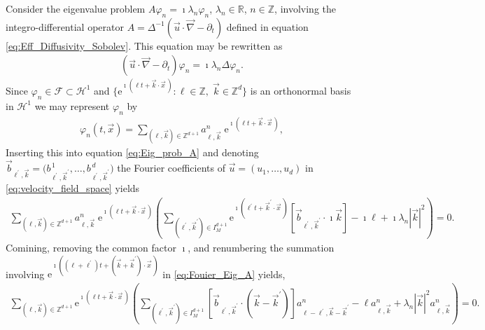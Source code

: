 \documentclass[11pt]{amsart}
\newcommand{\e}{\mathrm{e}}
\newcommand{\Hc}{\mathcal{H}}
\newcommand{\Fc}{\mathcal{F}}
\begin{document}
Consider the eigenvalue problem $A\varphi_n=\imath\lambda_n\varphi_n$, $\lambda_n\in\mathbb{R}$,
$n\in\mathbb{Z}$, involving the integro-differential operator 
$A=\Delta^{-1}(\vec{u}\cdot\vec{\nabla}-\partial_t)$ defined in equation
\eqref{eq:Eff_Diffusivity_Sobolev}. This equation may be rewritten as      
%
\begin{align}\label{eq:Eig_prob_A}
  (\vec{u}\cdot\vec{\nabla}-\partial_t)\varphi_n=\imath\lambda_n\Delta\varphi_n.
\end{align}
%
Since $\varphi_n\in\Fc\subset\Hc^1$ and
$\{\e^{\imath(\ell t+\vec{k}\cdot\vec{x}\,)}:\ell\in\mathbb{Z},\;\vec{k}\in\mathbb{Z}^d\}$ 
is an orthonormal basis in $\Hc^1$ \cite{Folland:99} we may represent
$\varphi_n$ by
% 
\begin{align}\label{eq:Fourier_Eig_fun}
  \varphi_n(t,\vec{x})=\sum_{(\ell,\vec{k})\in\mathbb{Z}^{d+1}}a^n_{\ell,\vec{k}}\;\e^{\imath(\ell t+\vec{k}\cdot\vec{x}\,)},
\end{align}
%
Inserting this into equation \eqref{eq:Eig_prob_A} and denoting 
$\vec{b}_{\ell^\prime,\vec{k}}=\big(b^{\,1}_{\ell^\prime,\vec{k}^\prime},\ldots,b^{\,d}_{\ell^\prime,\vec{k}^\prime}\big)$
the Fourier coefficients of $\vec{u}=(u_1,\ldots,u_d)$ in
\eqref{eq:velocity_field_space} yields   
%
\begin{align}\label{eq:Fouier_Eig_A}
  \sum_{(\ell,\vec{k})\in\mathbb{Z}^{d+1}
  }a^n_{\ell,\vec{k}}\;\e^{\imath(\ell t+\vec{k}\cdot\vec{x}\,)}
  \left(
    \sum_{(\ell^\prime,\vec{k}^\prime)\in I_M^{d+1}}\e^{\imath(\ell^\prime t+\vec{k}^\prime\cdot\vec{x}\,)}
  \left[\vec{b}_{\ell^\prime,\vec{k}^\prime}\cdot\imath\vec{k}
       \right]
  -\imath\ell
  +\imath\lambda_n|\vec{k}|^2\right)=0.
\end{align}
%
Comining, removing the common factor $\imath$, and renumbering the summation
involving $\e^{\imath((\ell+\ell^\prime)t+(\vec{k}+\vec{k}^\prime)\cdot\vec{x}\,)}$ in
\eqref{eq:Fouier_Eig_A} yields,
%
\begin{align}\label{eq:Fouier_Eig_A_resum}
  \sum_{(\ell,\vec{k})\in\mathbb{Z}^{d+1}}\e^{\imath(\ell t+\vec{k}\cdot\vec{x}\,)}
  \left(
    \sum_{(\ell^\prime,\vec{k}^\prime)\in I_M^{d+1}}
  \left[\vec{b}_{\ell^\prime,\vec{k}^\prime}\cdot(\vec{k}-\vec{k}^\prime)
       \right]a^n_{\ell-\ell^\prime,\vec{k}-\vec{k}^\prime}
  -\ell a^n_{\ell,\vec{k}}
  +\lambda_n|\vec{k}|^2a^n_{\ell,\vec{k}}\right)=0.
\end{align}
\end{document}
